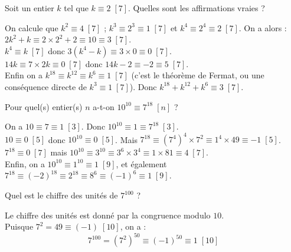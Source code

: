 \begin{question}
 Soit un entier $k$ tel que $k \equiv 2 \;[7]$. Quelles sont les affirmations vraies ?
    \begin{answers} 
    \end{answers}
    \begin{explanations} 
    On calcule que $k^2 \equiv 4 \;[7]$ ; $k^3 \equiv 2^3 \equiv 1 \;[7]$ et
    $k^4 \equiv 2^4 \equiv 2 \;[7]$. On a alors :\\
    $2k^2 + k \equiv 2 \times 2^2 + 2 \equiv 10 \equiv 3 \;[7]$.\\
    $k^4 \equiv k \;[7]$ donc $3(k^4-k) \equiv 3 \times 0 \equiv 0 \;[7]$.\\
    $14k \equiv 7 \times 2k \equiv 0 \;[7]$ donc $14k-2 \equiv -2 \equiv 5 \;[7]$.\\
    Enfin on a $k^{18} \equiv k^{12} \equiv k^6 \equiv 1 \;[7]$ (c'est le théorème de Fermat, ou une conséquence directe de $k^3 \equiv 1 \;[7]$). Donc 
    $k^{18} + k^{12} + k^6 \equiv 3 \;[7]$.
    \end{explanations}
\end{question}


\begin{question}
 Pour quel(s) entier(s) $n$ a-t-on $10^{10} \equiv 7^{18} \; [n]$ ?
    \begin{answers} 
    \end{answers}
    \begin{explanations} 
    On a $10 \equiv 7 \equiv 1 \;[3]$. Donc $10^{10} \equiv 1 \equiv 7^{18} \;[3]$.\\
    $10 \equiv 0 \;[5]$ donc $10^{10} \equiv 0 \;[5]$. Mais $7^{18} \equiv (7^4)^4 \times 7^2 \equiv 1^4 \times 49 \equiv -1 \;[5]$.\\
    $7^{18} \equiv 0 \;[7]$ mais $10^{10} \equiv 3^{10} \equiv 3^6 \times 3^4 \equiv 1 \times 81 \equiv 4 \;[7]$.\\
    Enfin, on a $10^{10} \equiv 1^{10} \equiv 1 \;[9]$, et également $7^{18} \equiv (-2)^{18} \equiv 2^{18} \equiv 8^6 \equiv (-1)^6 \equiv 1 \;[9]$.
    \end{explanations}
\end{question}


\begin{question}
 Quel est le chiffre des unités de $7^{100}$ ?
    \begin{answers} 
    \end{answers}
    \begin{explanations} 
    Le chiffre des unités est donné par la congruence modulo $10$.\\
    Puisque $7^2 = 49 \equiv (-1) \;[10]$, on a :
    $$ 7^{100} = (7^2)^{50} \equiv (-1)^{50} \equiv 1 \;[10]$$
    \end{explanations}
\end{question}

